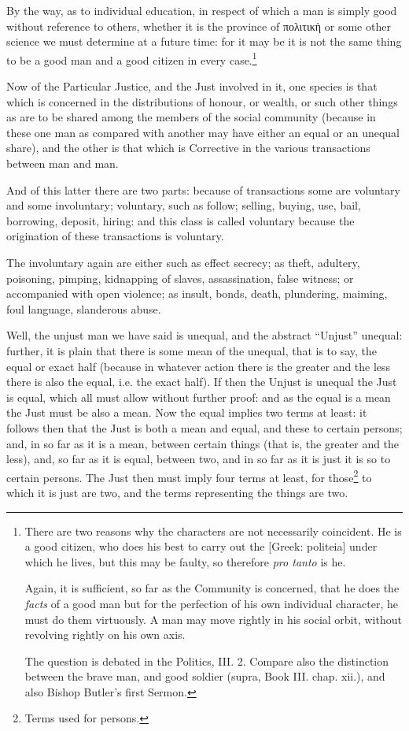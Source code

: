By the way, as to individual education, in respect of which a man is simply
good without reference to others, whether it is the province of
πολιτικὴ or some other science we must
determine at a future time: for it may be it is not the same thing to be a good
man and a good citizen in every case.\footnote{There are two reasons why the characters are not necessarily coincident. He is
a good citizen, who does his best to carry out the [Greek: politeia] under
which he lives, but this may be faulty, so therefore \emph{pro tanto} is
he.

Again, it is sufficient, so far as the Community is concerned, that he does
the \emph{facts} of a good man but for the perfection of his own individual
character, he must do them virtuously. A man may move rightly in his social
orbit, without revolving rightly on his own axis.

The question is debated in the Politics, III. 2. Compare also the
distinction between the brave man, and good soldier (supra, Book III. chap.
xii.), and also Bishop Butler’s first Sermon.}


Now of the Particular Justice, and the Just involved in it, one species is that
which is concerned in the distributions of honour, or wealth, or such other
things as are to be shared among the members of the social community (because
in these one man as compared with another may have either an equal or an
unequal share), and the other is that which is Corrective in the various
transactions between man and man.

And of this latter there are two parts: because of transactions some are
voluntary and some involuntary; voluntary, such as follow; selling, buying,
use, bail, borrowing, deposit, hiring: and this class is called voluntary
because the origination of these transactions is voluntary.

The involuntary again are either such as effect secrecy; as theft, adultery,
poisoning, pimping, kidnapping of slaves, assassination, false witness; or
accompanied with open violence; as insult, bonds, death, plundering, maiming,
foul language, slanderous abuse.


Well, the unjust man we have said is unequal, and the abstract
“Unjust” unequal: further, it is plain that there is some mean of
the unequal, that is to say, the equal or exact half (because in whatever
action there is the greater and the less there is also the equal, i.e. the
exact half). If then the Unjust is unequal the Just is equal, which all must
allow without further proof: and as the equal is a mean the Just must be also a
mean. Now the equal implies two terms at least: it follows then that the Just
is both a mean and equal, and these to certain persons; and, in so far as it is
a mean, between certain things (that is, the greater and the less), and, so far
as it is equal, between two, and in so far as it is just it is so to certain
persons. The Just then must imply four terms at least, for those\footnote{Terms used for persons.}
to which it is just are two, and the terms representing the things are two.

